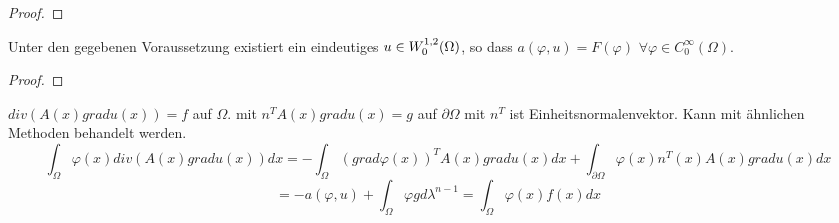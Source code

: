 	\begin{proof}
		\todor	
	\end{proof}

	\begin{cor}
		Unter den gegebenen Voraussetzung existiert ein eindeutiges $u\in W^{1,2}_0(\Omega)$, so dass $a(\varphi, u) = F(\varphi)$ $\forall \varphi \in C^\infty_0(\Omega)$.
	\end{cor}

	\begin{proof}
		\todor	
	\end{proof}

	\begin{bem}
		$div(A(x)grad u(x)) = f$ auf $\Omega$. mit $n^T A(x) grad u(x) = g$ auf $\partial \Omega$	mit $n^T$ ist Einheitsnormalenvektor. Kann mit ähnlichen Methoden behandelt werden.
		$$\int_\Omega \varphi(x) div (A(x) grad u(x)) dx = - \int_\Omega (grad \varphi(x))^T A(x) gradu(x) dx + \int_{\partial\Omega} \varphi(x) n^T(x) A(x) grad u(x) dx$$ 
	$$ = -a(\varphi, u) + \int_\Omega \varphi g d\lambda^{n-1} = \int_\Omega \varphi(x) f(x) dx$$
	\end{bem}
